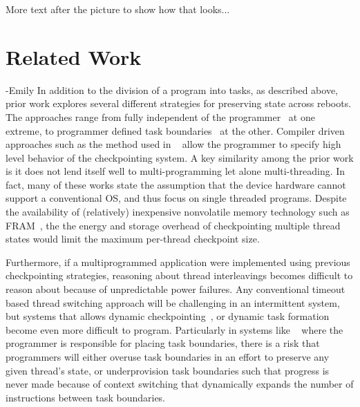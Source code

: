 \documentclass[11pt]{sensys-proc}
\begin{document}
More text after the picture to show how that looks...


\section{Related Work} -Emily
In addition to the division of a program into tasks, as described above, prior work
explores several different strategies for preserving state across reboots. The approaches
range from fully independent of the programmer~\cite{ratchet, dewdrop} at one extreme, to programmer
defined task boundaries~\cite{dino} at the other.  Compiler driven approaches such as the
method used in ~\cite{Mementos} allow the programmer to specify high level behavior of the
checkpointing system. A key similarity among the prior work is it
does not lend itself well to multi-programming let
alone multi-threading. In fact, many of these works state the assumption that the device
hardware cannot support a conventional OS, and thus focus on single threaded programs. 
Despite the availability of (relatively) inexpensive nonvolatile memory technology such as
FRAM~\cite{quickrecall}, the the energy and storage overhead of checkpointing multiple
thread states would limit the maximum per-thread checkpoint size. 

Furthermore, if a multiprogrammed application were implemented using previous
checkpointing strategies, reasoning about thread interleavings becomes  difficult to
reason about because of unpredictable power failures. Any conventional timeout based
thread switching approach will be challenging in an intermittent system, but systems that
allows dynamic checkpointing~\cite{hibernus}, or dynamic task formation~\cite{Dino} become
even more difficult to program. Particularly in systems like ~\cite{Dino} where the
programmer is responsible for placing task boundaries, there is a risk that programmers
will either overuse task boundaries in an effort to preserve any given thread's state, or
underprovision task boundaries such that progress is never made because of context
switching that dynamically expands the number of instructions between task boundaries. 
\end{document}
